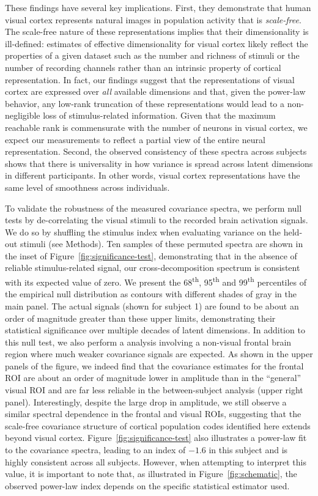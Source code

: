 \documentclass[10pt]{article}
\begin{document}
These findings have several key implications. First, they demonstrate that human visual cortex represents natural images in population activity that is \emph{scale-free}. The scale-free nature of these representations implies that their dimensionality is ill-defined: estimates of effective dimensionality for visual cortex likely reflect the properties of a given dataset such as the number and richness of stimuli or the number of recording channels rather than an intrinsic property of cortical representation. In fact, our findings suggest that the representations of visual cortex are expressed over \emph{all} available dimensions and that, given the power-law behavior, any low-rank truncation of these representations would lead to a non-negligible loss of stimulus-related information. Given that the maximum reachable rank is commensurate with the number of neurons in visual cortex, we expect our measurements to reflect a partial view of the entire neural representation. Second, the observed consistency of these spectra across subjects shows that there is universality in how variance is spread across latent dimensions in different participants. In other words, visual cortex representations have the same level of smoothness across individuals.

To validate the robustness of the measured covariance spectra, we perform null tests by de-correlating the visual stimuli to the recorded brain activation signals. We do so by shuffling the stimulus index when evaluating variance on the held-out stimuli (see Methods). Ten samples of these permuted spectra are shown in the inset of Figure~\ref{fig:significance-test}, demonstrating that in the absence of reliable stimulus-related signal, our cross-decomposition spectrum is consistent with its expected value of zero. We present the 68\textsuperscript{th}, 95\textsuperscript{th} and 99\textsuperscript{th} percentiles of the empirical null distribution as contours with different shades of gray in the main panel. The actual signals (shown for subject 1) are found to be about an order of magnitude greater than these upper limits, demonstrating their statistical significance over multiple decades of latent dimensions. In addition to this null test, we also perform a analysis involving a non-visual frontal brain region where much weaker covariance signals are expected. As shown in the upper panels of the figure, we indeed find that the covariance estimates for the frontal ROI are about an order of magnitude lower in amplitude than in the ``general'' visual ROI and are far less reliable in the between-subject analysis (upper right panel). Interestingly, despite the large drop in amplitude, we still observe a similar spectral dependence in the frontal and visual ROIs, suggesting that the scale-free covariance structure of cortical population codes identified here extends beyond visual cortex. Figure~\ref{fig:significance-test} also illustrates a power-law fit to the covariance spectra, leading to an index of \(-1.6\) in this subject and is highly consistent across all subjects. However, when attempting to interpret this value, it is important to note that, as illustrated in Figure~\ref{fig:schematic}, the observed power-law index depends on the specific statistical estimator used.
\end{document}
